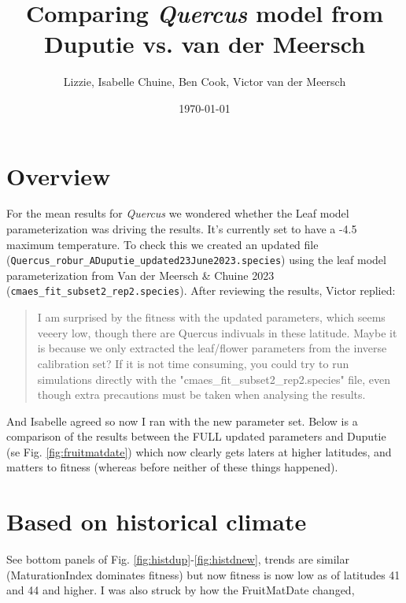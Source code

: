 \documentclass[11pt,letter]{article}
\begin{document}

\renewcommand{\refname}{\CHead{}}

\title{Comparing \emph{Quercus} model from \\ Duputie vs. van der Meersch}
\author{Lizzie, Isabelle Chuine, Ben Cook, Victor van der Meersch}
\date{\today}
\maketitle

\section*{Overview}
For the mean results for \emph{Quercus} we wondered whether the Leaf model parameterization was driving the results. It's currently set to have a -4.5 maximum temperature. To check this we created an updated file (\verb|Quercus_robur_ADuputie_updated23June2023.species|) using the leaf model parameterization from Van der Meersch \& Chuine 2023 (\verb|cmaes_fit_subset2_rep2.species|). After reviewing the results, Victor replied:

\begin{quote}
I am surprised by the fitness with the updated parameters, which seems veeery low, though there are Quercus indivuals in these latitude.
Maybe it is because we only extracted the leaf/flower parameters from the inverse calibration set?
If it is not time consuming, you could try to run simulations directly with the "cmaes\_fit\_subset2\_rep2.species" file, even though extra precautions must be taken when analysing the results.
\end{quote}

And Isabelle agreed so now I ran with the new parameter set. Below is a comparison of the results between the FULL updated parameters and Duputie (se Fig. \ref{fig:fruitmatdate}) which now clearly gets laters at higher latitudes, and matters to fitness (whereas before neither of these things happened). 

\section*{Based on historical climate}

See bottom panels of Fig. \ref{fig:histdup}-\ref{fig:histdnew}, trends are similar (MaturationIndex dominates fitness) but now fitness is now low as of latitudes 41 and 44 and higher. I was also struck by how the FruitMatDate changed, 
\end{document}
